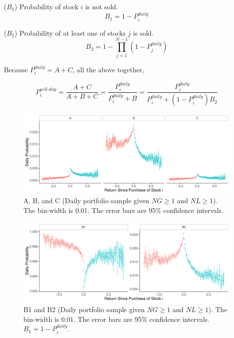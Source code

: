 \documentclass[11pt, a4paper]{article}
\newcommand{\HS}[1]{\textcolor{blue}{HS: #1}}
\begin{document}
\begin{appendices}
\noindent
($B_{1}$) Probability of stock $i$ is not sold.
\begin{equation}
\label{eq:B1}
B_1 = 1-P^{daily}_{i}
\end{equation}

\noindent
($B_{2}$) Probability of at least one of stocks $j$ is sold.
\begin{equation}
\label{eq:B2}
B_2 = 1-\prod_{j=1}^{N-1}(1-P^{daily}_{j})
\end{equation}

\noindent

Because $P^{daily}_{i} = A+C$, all the above together,

\begin{equation}
\label{eq:PABC}
P^{sell\mbox{-}day}_{i} = \frac{A+C}{A+B+C} = \frac{P^{daily}_{i}}{P^{daily}_{i}+B} = \frac{P^{daily}_{i}}{P^{daily}_{i}+(1-P^{daily}_{i})B_2}
\end{equation}



\begin{figure}[H]
	\centering
	\includegraphics[width=1\columnwidth]{barc_ABC_NG1_NL1.pdf}
	\caption{\small A, B, and C (Daily portfolio sample given $NG\geq1$ and $NL\geq1$). The bin-width is 0.01. The error bars are 95\% confidence intervals.}
	\label{figure:prop_ABC_NG1NL1}
\end{figure}

\begin{figure}[H]
	\centering
	\includegraphics[width=1\columnwidth]{barc_B12_NG1_NL1.pdf}
	\caption{\small B1 and B2 (Daily portfolio sample given $NG\geq1$ and $NL\geq1$). The bin-width is 0.01. The error bars are 95\% confidence intervals. $B_{1}=1-P^{daily}_{i}$.}
	\label{figure:prop_B12_NG1NL1}
\end{figure}

\end{appendices}

\pagebreak


\end{document}
